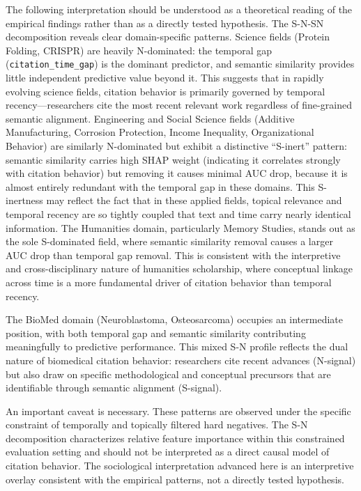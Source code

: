 \documentclass[11pt,a4paper]{article}
\begin{document}
The following interpretation should be understood as a theoretical reading of the empirical findings rather than as a directly tested hypothesis. The S-N-SN decomposition reveals clear domain-specific patterns. Science fields (Protein Folding, CRISPR) are heavily N-dominated: the temporal gap (\texttt{citation\_time\_gap}) is the dominant predictor, and semantic similarity provides little independent predictive value beyond it. This suggests that in rapidly evolving science fields, citation behavior is primarily governed by temporal recency---researchers cite the most recent relevant work regardless of fine-grained semantic alignment. Engineering and Social Science fields (Additive Manufacturing, Corrosion Protection, Income Inequality, Organizational Behavior) are similarly N-dominated but exhibit a distinctive ``S-inert'' pattern: semantic similarity carries high SHAP weight (indicating it correlates strongly with citation behavior) but removing it causes minimal AUC drop, because it is almost entirely redundant with the temporal gap in these domains. This S-inertness may reflect the fact that in these applied fields, topical relevance and temporal recency are so tightly coupled that text and time carry nearly identical information. The Humanities domain, particularly Memory Studies, stands out as the sole S-dominated field, where semantic similarity removal causes a larger AUC drop than temporal gap removal. This is consistent with the interpretive and cross-disciplinary nature of humanities scholarship, where conceptual linkage across time is a more fundamental driver of citation behavior than temporal recency.

The BioMed domain (Neuroblastoma, Osteosarcoma) occupies an intermediate position, with both temporal gap and semantic similarity contributing meaningfully to predictive performance. This mixed S-N profile reflects the dual nature of biomedical citation behavior: researchers cite recent advances (N-signal) but also draw on specific methodological and conceptual precursors that are identifiable through semantic alignment (S-signal).

An important caveat is necessary. These patterns are observed under the specific constraint of temporally and topically filtered hard negatives. The S-N decomposition characterizes relative feature importance within this constrained evaluation setting and should not be interpreted as a direct causal model of citation behavior. The sociological interpretation advanced here is an interpretive overlay consistent with the empirical patterns, not a directly tested hypothesis.
\end{document}
